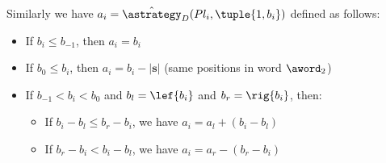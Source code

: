 Similarly we have $a_i=\hat\astrategy_D(Pl_i,\tuple{1,b_i})$ defined as follows:
\begin{itemize}
\item If $b_i\leq b_{-1}$, then $a_i=b_i$
\item If $b_0 \leq b_{i}$, then $a_i=b_i-|\mathbf{s}|$ (same positions in word $\aword_2$)
\item If $b_{-1} < b_i < b_0$ and $b_l=\lef{b_i}$ and $b_r=\rig{b_i}$, then:
\begin{itemize}
\item  If $b_i-b_l \leq b_r-b_i$, we have $a_i=a_l+(b_i-b_l)$
\item  If $b_r-b_i < b_i-b_l$, we have $a_i=a_r-(b_r-b_i)$
\end{itemize}
\end{itemize}


